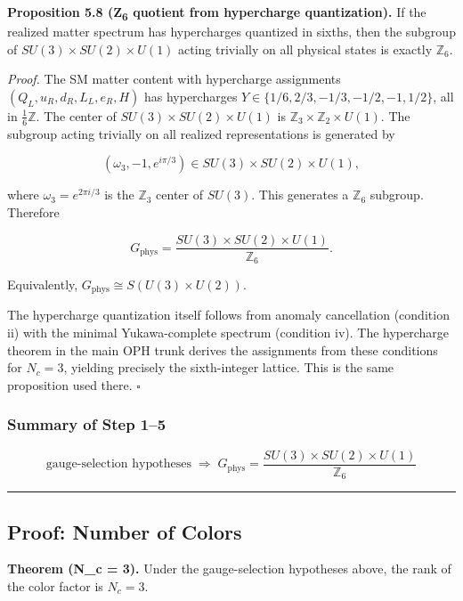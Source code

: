 \textbf{Proposition 5.8 (Z\textsubscript{6} quotient from hypercharge quantization).} If the realized matter spectrum has hypercharges quantized in sixths, then the subgroup of \(SU(3) \times SU(2) \times U(1)\) acting trivially on all physical states is exactly \(\mathbb{Z}_6\).

\emph{Proof.} The SM matter content with hypercharge assignments \((Q_L, u_R, d_R, L_L, e_R, H)\) has hypercharges \(Y \in \{1/6, 2/3, -1/3, -1/2, -1, 1/2\}\), all in \(\frac{1}{6}\mathbb{Z}\). The center of \(SU(3) \times SU(2) \times U(1)\) is \(\mathbb{Z}_3 \times \mathbb{Z}_2 \times U(1)\). The subgroup acting trivially on all realized representations is generated by

\[(\omega_3, -1, e^{i\pi/3}) \in SU(3) \times SU(2) \times U(1),\]

where \(\omega_3 = e^{2\pi i/3}\) is the \(\mathbb{Z}_3\) center of \(SU(3)\). This generates a \(\mathbb{Z}_6\) subgroup. Therefore

\[G_{\mathrm{phys}} = \frac{SU(3) \times SU(2) \times U(1)}{\mathbb{Z}_6}.\]

Equivalently, \(G_{\mathrm{phys}} \cong S(U(3) \times U(2))\).

The hypercharge quantization itself follows from anomaly cancellation (condition ii) with the minimal Yukawa-complete spectrum (condition iv). The hypercharge theorem in the main OPH trunk derives the assignments from these conditions for \(N_c = 3\), yielding precisely the sixth-integer lattice. This is the same proposition used there. \(\square\)

\subsubsection{Summary of Step 1--5}\label{summary-of-step-15}

\[\boxed{\text{gauge-selection hypotheses} \;\Longrightarrow\; G_{\mathrm{phys}} = \frac{SU(3) \times SU(2) \times U(1)}{\mathbb{Z}_6}}\]

\begin{center}\rule{0.5\linewidth}{0.5pt}\end{center}

\subsection{Proof: Number of Colors}\label{6-proof-number-of-colors}

\textbf{Theorem (N\_c = 3).} Under the gauge-selection hypotheses above, the rank of the color factor is \(N_c = 3\).


